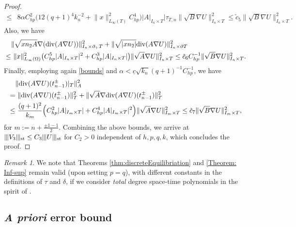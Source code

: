 \documentclass{amsart}
\newcommand{\norm}[2]{\|{#1}\|_{{#2}}}
\newcommand{\Div}{{\rm div}}
\newcommand{\ndg}[1]{|\kern-.03cm \|{#1}|\kern-.03cm \|}
\newcommand{\chp}{C_{hp}}
\newcommand{\normal}{{n}}
\theoremstyle{definition}
\theoremstyle{remark}
\newtheorem{remark}[theorem]{Remark}
\numberwithin{equation}{section}
\begin{document}
\begin{proof}
\begin{equation*}
\begin{split}
		\leq&  8\alpha \chp^2
	\big(   12(q+1)^4k_{n}^{-2}    \! +\!
		\norm{{x}}{L_\infty(T)}^2 \chp^4\big)|A|_{I_n\times T}|\tau_{T,n}\norm{\sqrt{B}\nabla U}{I_n\times T}^2
	 \leq   \tilde{c}_{5}   \norm{\sqrt{B}\nabla U}{I_n\times T}^2.
\end{split}\end{equation*}
Also,  we have
\begin{equation*}\begin{split}
		& \norm{ \sqrt{x\normal_2 A}\nabla (\Div(A\nabla U)) }{I_n\times \partial_+ T}^2 + \norm{ \sqrt{|x\normal_2|} \Div(A\nabla U)}{I_n\times \partial T}^2 \\
		\leq &\
\norm{x}{L_\infty(\Omega)}^2 \big(	 \chp^5 |A|_{I_n\times T}|^2
+ \chp^3 |A|_{I_n\times T}|  \big) \norm{ \sqrt{A}\nabla U }{I_n\times T}^2
	  \leq   \tilde{c}_{6} \chp^{-1}  \norm{\sqrt{B}\nabla U}{I_n\times T}^2.
\end{split}\end{equation*}
Finally,  employing again \eqref{bounds} and $\alpha< \underline{c}\sqrt{k_n}(q+1)^{-1}\chp^{-1}$, we have
\begin{equation*}\begin{split}
			& \norm{\Div(A\nabla U)(t_{n-1}^\pm)|_{T}}{A}^2 \\
			=&\
		\norm{\Div(A\nabla U)(t_{n-1}^\pm)}{T}^2
		+\norm{\sqrt{A}\nabla\Div(A\nabla U)(t_{n-1}^\pm)}{ T}^2
		\\
		\leq &\
  \frac{(q+1)^2}{k_m}  \Big(  \chp^2 |A|_{I_m\times T}|
		+ \chp^4 |A|_{I_m\times T}|^2   \Big) \norm{\sqrt{A} \nabla U }{I_m\times  T }^2
		  \leq   \tilde{c}_{7} \norm{\sqrt{B}\nabla U}{I_m\times T}^2,
\end{split}\end{equation*}
for $m:=n+\frac{\pm 1-1}{2}$.   Combining the above bounds, we arrive at $\ndg{V_3}_{\rm st}\leq C_3 \ndg{U}_{\rm st}$ for $C_2>0$ independent of $h,p,q,k$, which concludes the proof.
\end{proof}

\begin{remark}
	We note that Theorems \ref{thm:discreteEquilibriation} and \ref{Theorem: Inf-sup} remain valid (upon setting $p=q$), with different constants in the definitions of $\tau$ and $\delta$, if we consider \emph{total} degree space-time polynomials in the spirit of \cite{MR3672375}.
\end{remark}




\subsection{\emph{A priori} error bound}
\end{document}
